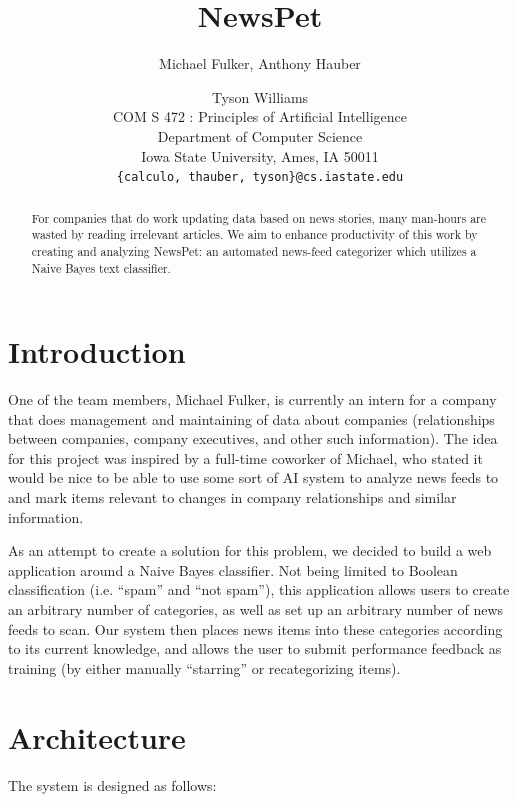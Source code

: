 \documentclass[letterpaper]{article}
\title{NewsPet}
\author{Michael Fulker, Anthony Hauber \and Tyson Williams \\
COM S 472 : Principles of Artificial Intelligence\\Department of Computer Science\\ Iowa State University, Ames, IA 50011\\
\texttt{\{calculo, thauber, tyson\}@cs.iastate.edu}}
\begin{document}
\nocopyright
\maketitle

\begin{abstract}
For companies that do work updating data based on news stories, many man-hours are wasted by reading irrelevant articles.
We aim to enhance productivity of this work by creating and analyzing NewsPet: an automated news-feed categorizer which utilizes a Naive Bayes text classifier.
\end{abstract}

\section{Introduction}
One of the team members, Michael Fulker, is currently an intern for a company that does management and maintaining of data about companies (relationships between companies, company executives, and other such information).
The idea for this project was inspired by a full-time coworker of Michael, who stated it would be nice to be able to use some sort of AI system to analyze news feeds to and mark items relevant to changes in company relationships and similar information.

As an attempt to create a solution for this problem, we decided to build a web application around a Naive Bayes classifier. Not being limited to Boolean classification (i.e. ``spam'' and ``not spam''), this application allows users to create an arbitrary number of categories, as well as set up an arbitrary number of news feeds to scan. Our system then places news items into these categories according to its current knowledge, and allows the user to submit performance feedback as training (by either manually ``starring'' or recategorizing items).

\pagebreak
\section{Architecture}
The system is designed as follows:
\end{document}
